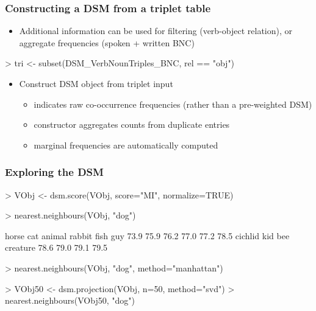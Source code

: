 \documentclass[t]{beamer} %
\begin{document}
\begin{frame}[fragile]
  \frametitle{Constructing a DSM from a triplet table}

  \begin{itemize}
  \item Additional information can be used for filtering (verb-object relation), or aggregate frequencies (spoken + written BNC)
  \end{itemize}

\ungap[.5]
\begin{Rcode}
> tri <- subset(DSM_VerbNounTriples_BNC, rel == "obj")
\end{Rcode}

  \begin{itemize}
  \item Construct DSM object from triplet input
    \begin{itemize}
    \item {} indicates raw co-occurrence frequencies (rather than a pre-weighted DSM)
    \item constructor aggregates counts from duplicate entries
    \item marginal frequencies are automatically computed
    \end{itemize}
  \end{itemize}

\ungap[.5]
\end{frame}

\begin{frame}[fragile]
  \frametitle{Exploring the DSM}

\begin{Rcode}
> VObj <- dsm.score(VObj, score="MI", normalize=TRUE)

> nearest.neighbours(VObj, "dog") \begin{Rout}
   horse      cat   animal   rabbit     fish      guy  
    73.9     75.9     76.2     77.0     77.2     78.5  
 cichlid      kid      bee creature 
    78.6     79.0     79.1     79.5 
\end{Rout}
> nearest.neighbours(VObj, "dog", method="manhattan")

> VObj50 <- dsm.projection(VObj, n=50, method="svd")
> nearest.neighbours(VObj50, "dog")
\end{Rcode}
\end{frame}
\end{document}
